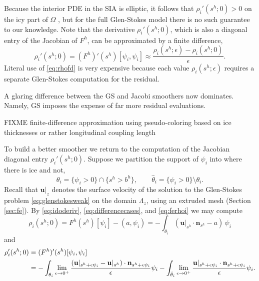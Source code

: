 \documentclass[letterpaper,final,12pt,reqno]{amsart}
\theoremstyle{claim}
\newcommand{\eps}{\epsilon}
\newcommand{\bn}{\mathbf{n}}
\newcommand{\bu}{\mathbf{u}}
\newcommand{\ip}[2]{\left(#1,#2\right)}
\numberwithin{equation}{section}
\numberwithin{figure}{section}
\numberwithin{table}{section}
\numberwithin{theorem}{section}
\begin{document}
Because the interior PDE in the SIA is elliptic, it follows that $\rho_i'(s^h; 0) > 0$ on the icy part of $\Omega$ \cite{JouvetBueler2012}, but for the full Glen-Stokes model there is no such guarantee to our knowledge.  Note that the derivative $\rho_i'(s^h; 0)$, which is also a diagonal entry of the Jacobian of $F^h$, can be approximated by a finite difference,
\begin{equation}
\rho_i'(s^h; 0) = (F^h)'(s^h)[\psi_i,\psi_i] \approx \frac{\rho_i(s^h; \eps) - \rho_i(s^h; 0)}{\eps}.  \label{eq:rhofd}
\end{equation}
Literal use of \eqref{eq:rhofd} is very expensive because each value $\rho_i(s^h; \eps)$ requires a separate Glen-Stokes computation for the residual.

A glaring difference between the GS and Jacobi smoothers now dominates.  Namely, GS imposes the expense of far more residual evaluations.

FIXME finite-difference approximation using pseudo-coloring based on ice thicknesses or rather longitudinal coupling length \cite{KambEchelmeyer1986}

To build a better smoother we return to the computation of the Jacobian diagonal entry $\rho_i'(s^h; 0)$.  Suppose we partition the support of $\psi_i$ into where there is ice and not,
\begin{equation}
\theta_i = \{\psi_i > 0\} \cap \{s^h > b^h\}, \qquad {\hat\theta}_i = \{\psi_i > 0\} \setminus \theta_i.  \label{eq:thetasupport}
\end{equation}
Recall that $\bu|_{z}$ denotes the surface velocity of the solution to the Glen-Stokes problem \eqref{eq:glenstokesweak} on the domain $\Lambda_{z}$, using an extruded mesh (Section \ref{sec:fe}).  By \eqref{eq:idoderiv}, \eqref{eq:differencecases}, and \eqref{eq:ferhoi} we may compute
\begin{equation}
\rho_i(s^h; 0) = F^h(s^h)[\psi_i] - \ip{a}{\psi_i} = - \int_{\theta_i} (\bu|_{s^h} \cdot \bn_{s^h}- a)\, \psi_i  \label{eq:rhozero}
\end{equation}
and
\begin{align}
\rho_i'(s^h; 0) &= (F^h)'(s^h)[\psi_i,\psi_i]  \label{eq:rholocalderiv} \\
  &= - \int_{\theta_i} \lim_{\eps\to 0^+} \frac{(\bu|_{s^h+\eps\psi_i} - \bu|_{s^h}) \cdot \bn_{s^h+\eps\psi_i}}{\eps} \psi_i - \int_{{\hat\theta}_i} \lim_{\eps\to 0^+} \frac{\bu|_{s^h+\eps\psi_i} \cdot \bn_{s^h+\eps\psi_i}}{\eps} \psi_i.  \notag
\end{align}
\end{document}
